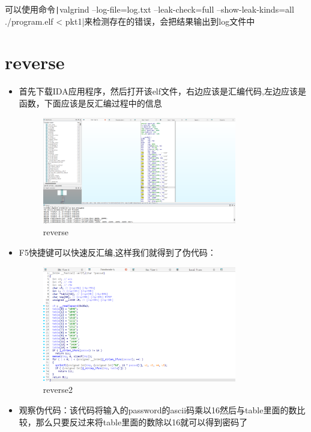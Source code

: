 \documentclass{article}
\begin{document}
可以使用命令\texttt|valgrind --log-file=log.txt --leak-check=full --show-leak-kinds=all ./program.elf < pkt1|来检测存在的错误，会把结果输出到log文件中

\section*{reverse}
\begin{itemize}
    \item 首先下载IDA应用程序，然后打开该elf文件，右边应该是汇编代码,左边应该是函数，下面应该是反汇编过程中的信息
    \begin{figure}[H]
        \centering
        \includegraphics[width=0.8\textwidth]{./figure/reverse.png}
        \caption{reverse}
    \end{figure}
    \item F5快捷键可以快速反汇编,这样我们就得到了伪代码：
    \begin{figure}[H]
        \centering
        \includegraphics[width=0.8\textwidth]{./figure/reverse2.png}
        \caption{reverse2}
    \end{figure}
    \item 观察伪代码：该代码将输入的password的ascii码乘以16然后与table里面的数比较，那么只要反过来将table里面的数除以16就可以得到密码了
    \begin{figure}[H]
        \centering

\end{figure}
\end{itemize}
\end{document}
